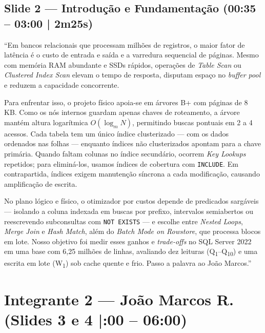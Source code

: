 \documentclass[10pt,a4paper]{article}
\begin{document}
\subsection{Slide 2 — Introdução e Fundamentação (00:35 – 03:00 | 2m25s)}
\begin{fala}
``Em bancos relacionais que processam milhões de registros, o maior fator de latência é o custo de entrada e saída e a varredura sequencial de páginas. Mesmo com memória RAM abundante e SSDs rápidos, operações de \textit{Table Scan} ou \textit{Clustered Index Scan} elevam o tempo de resposta, disputam espaço no \textit{buffer pool} e reduzem a capacidade concorrente.

Para enfrentar isso, o projeto físico apoia-se em árvores B+ com páginas de 8 KB. Como os nós internos guardam apenas chaves de roteamento, a árvore mantém altura logarítmica $O(\log_m N)$, permitindo buscas pontuais em 2 a 4 acessos. Cada tabela tem um único índice clusterizado — com os dados ordenados nas folhas — enquanto índices não clusterizados apontam para a chave primária. Quando faltam colunas no índice secundário, ocorrem \textit{Key Lookups} repetidos; para eliminá-los, usamos índices de cobertura com \texttt{INCLUDE}. Em contrapartida, índices exigem manutenção síncrona a cada modificação, causando amplificação de escrita.

No plano lógico e físico, o otimizador por custos depende de predicados sargáveis — isolando a coluna indexada em buscas por prefixo, intervalos semiabertos ou reescrevendo subconsultas com \texttt{NOT EXISTS} — e escolhe entre \textit{Nested Loops}, \textit{Merge Join} e \textit{Hash Match}, além do \textit{Batch Mode on Rowstore}, que processa blocos em lote. Nosso objetivo foi medir esses ganhos e \textit{trade-offs} no SQL Server 2022 em uma base com 6,25 milhões de linhas, avaliando dez leituras (Q\textsubscript{1}–Q\textsubscript{10}) e uma escrita em lote (W\textsubscript{1}) sob cache quente e frio. Passo a palavra ao João Marcos.''
\end{fala}

\section{Integrante 2 — João Marcos R. (Slides 3 e 4 \enspace|:00 – 06:00)}
\end{document}
